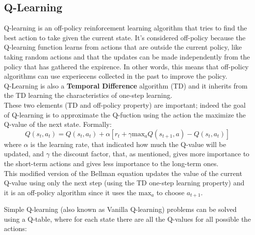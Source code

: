 \documentclass[14pt]{extarticle}
\def\sp{\vspace{5pt}}
\def\ppn{\vspace{10pt}}
\begin{document}
\begin{flushleft}
\subsection{Q-Learning}
\sp
Q-learning is an off-policy reinforcement learning algorithm that tries to find the best action to take given the current state. It's considered off-policy because the Q-learning function learns from actions that are outside the current policy, like taking random actions and that the updates can be made independently from the policy that has gathered the expirence. In other words, this means that off-policy algorithms can use experiecens collected in the past to improve the policy.\\
Q-Learning is also a \textbf{Temporal Difference} algorithm (TD\cite{TDl}) and it inherits from the TD learning the characteristics of one-step learning.\\
These two elements (TD and off-policy property) are important; indeed the goal of Q-learning is to approximate the Q-fuction using the action the maximize the Q-value of the next state. Formally:
\begin{equation} \label{eq:2}
 Q(s_t,a_t) = Q(s_t,a_t) + 
\alpha[r_t + \gamma \text{max}_{a}Q(s_{t+1},a) - Q(s_t,a_t)] 
\end{equation}
where $\alpha$ is the learning rate, that indicated how much the Q-value will be updated, and $\gamma$ the discount factor, that, as mentioned, gives more importance to the short-term actions and gives less importance to the long-term ones. \\
This modified version of the Bellman equation updates the value of the current Q-value using only the next step (using the TD one-step learning property) and it is an off-policy 
algorithm since it uses the $\text{max}_{a}$ to choose $a_{t+1}$.

\ppn
Simple Q-learning (also known as Vanilla Q-learning) problems can be solved using a Q-table, where for each state there are all the Q-values for all possible the actions:


\end{flushleft}
\end{document}

